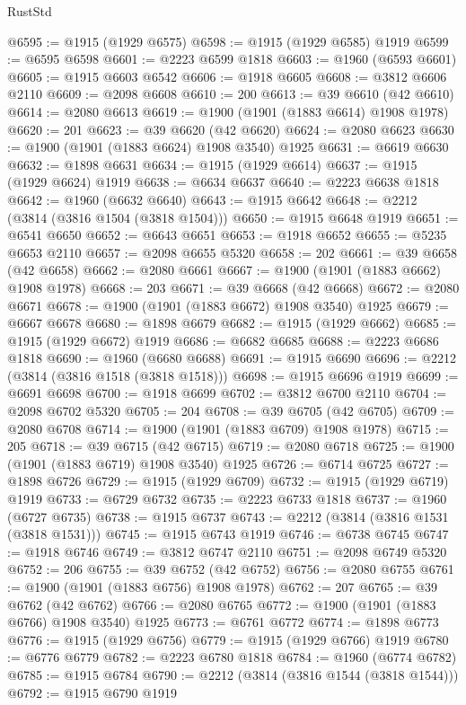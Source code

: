 \begin{lexlean}{RustStd}
\begin{coremodule}
{\begin{coremodule}
{{{{{{{{{{{{{{{{{{{{{{{{{{{{{{{{{{{{{{{{{{{@6595 := @1915 (@1929 @6575)
@6598 := @1915 (@1929 @6585) @1919
@6599 := @6595 @6598
@6601 := @2223 @6599 @1818
@6603 := @1960 (@6593 @6601)
@6605 := @1915 @6603 @6542
@6606 := @1918 @6605
@6608 := @3812 @6606 @2110
@6609 := @2098 @6608
@6610 := 200
@6613 := @39 @6610 (@42 @6610)
@6614 := @2080 @6613
@6619 := @1900 (@1901 (@1883 @6614) @1908 @1978)
@6620 := 201
@6623 := @39 @6620 (@42 @6620)
@6624 := @2080 @6623
@6630 := @1900 (@1901 (@1883 @6624) @1908 @3540) @1925
@6631 := @6619 @6630
@6632 := @1898 @6631
@6634 := @1915 (@1929 @6614)
@6637 := @1915 (@1929 @6624) @1919
@6638 := @6634 @6637
@6640 := @2223 @6638 @1818
@6642 := @1960 (@6632 @6640)
@6643 := @1915 @6642
@6648 := @2212 (@3814 (@3816 @1504 (@3818 @1504)))
@6650 := @1915 @6648 @1919
@6651 := @6541 @6650
@6652 := @6643 @6651
@6653 := @1918 @6652
@6655 := @5235 @6653 @2110
@6657 := @2098 @6655 @5320
@6658 := 202
@6661 := @39 @6658 (@42 @6658)
@6662 := @2080 @6661
@6667 := @1900 (@1901 (@1883 @6662) @1908 @1978)
@6668 := 203
@6671 := @39 @6668 (@42 @6668)
@6672 := @2080 @6671
@6678 := @1900 (@1901 (@1883 @6672) @1908 @3540) @1925
@6679 := @6667 @6678
@6680 := @1898 @6679
@6682 := @1915 (@1929 @6662)
@6685 := @1915 (@1929 @6672) @1919
@6686 := @6682 @6685
@6688 := @2223 @6686 @1818
@6690 := @1960 (@6680 @6688)
@6691 := @1915 @6690
@6696 := @2212 (@3814 (@3816 @1518 (@3818 @1518)))
@6698 := @1915 @6696 @1919
@6699 := @6691 @6698
@6700 := @1918 @6699
@6702 := @3812 @6700 @2110
@6704 := @2098 @6702 @5320
@6705 := 204
@6708 := @39 @6705 (@42 @6705)
@6709 := @2080 @6708
@6714 := @1900 (@1901 (@1883 @6709) @1908 @1978)
@6715 := 205
@6718 := @39 @6715 (@42 @6715)
@6719 := @2080 @6718
@6725 := @1900 (@1901 (@1883 @6719) @1908 @3540) @1925
@6726 := @6714 @6725
@6727 := @1898 @6726
@6729 := @1915 (@1929 @6709)
@6732 := @1915 (@1929 @6719) @1919
@6733 := @6729 @6732
@6735 := @2223 @6733 @1818
@6737 := @1960 (@6727 @6735)
@6738 := @1915 @6737
@6743 := @2212 (@3814 (@3816 @1531 (@3818 @1531)))
@6745 := @1915 @6743 @1919
@6746 := @6738 @6745
@6747 := @1918 @6746
@6749 := @3812 @6747 @2110
@6751 := @2098 @6749 @5320
@6752 := 206
@6755 := @39 @6752 (@42 @6752)
@6756 := @2080 @6755
@6761 := @1900 (@1901 (@1883 @6756) @1908 @1978)
@6762 := 207
@6765 := @39 @6762 (@42 @6762)
@6766 := @2080 @6765
@6772 := @1900 (@1901 (@1883 @6766) @1908 @3540) @1925
@6773 := @6761 @6772
@6774 := @1898 @6773
@6776 := @1915 (@1929 @6756)
@6779 := @1915 (@1929 @6766) @1919
@6780 := @6776 @6779
@6782 := @2223 @6780 @1818
@6784 := @1960 (@6774 @6782)
@6785 := @1915 @6784
@6790 := @2212 (@3814 (@3816 @1544 (@3818 @1544)))
@6792 := @1915 @6790 @1919
}}}}}}}}}}}}}}}}}}}}}}}}}}}}}}}}}}}}}}}}}}}
\end{coremodule}}
\end{coremodule}
\end{lexlean}
